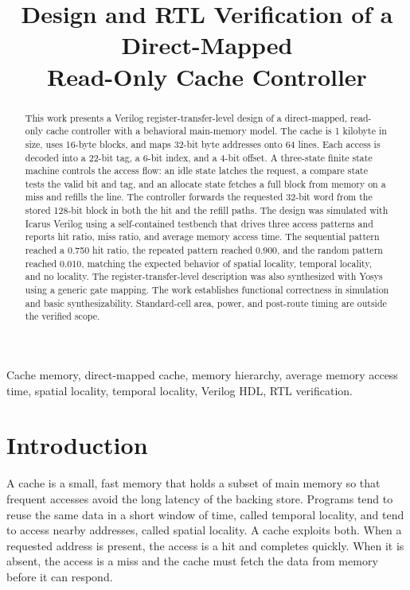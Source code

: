 \documentclass[conference]{IEEEtran}
\begin{document}
\title{Design and RTL Verification of a Direct-Mapped\\ Read-Only Cache Controller}

\author{
}

\maketitle

\begin{abstract}
This work presents a Verilog register-transfer-level design of a direct-mapped, read-only cache controller with a behavioral main-memory model. The cache is 1 kilobyte in size, uses 16-byte blocks, and maps 32-bit byte addresses onto 64 lines. Each access is decoded into a 22-bit tag, a 6-bit index, and a 4-bit offset. A three-state finite state machine controls the access flow: an idle state latches the request, a compare state tests the valid bit and tag, and an allocate state fetches a full block from memory on a miss and refills the line. The controller forwards the requested 32-bit word from the stored 128-bit block in both the hit and the refill paths. The design was simulated with Icarus Verilog using a self-contained testbench that drives three access patterns and reports hit ratio, miss ratio, and average memory access time. The sequential pattern reached a 0.750 hit ratio, the repeated pattern reached 0.900, and the random pattern reached 0.010, matching the expected behavior of spatial locality, temporal locality, and no locality. The register-transfer-level description was also synthesized with Yosys using a generic gate mapping. The work establishes functional correctness in simulation and basic synthesizability. Standard-cell area, power, and post-route timing are outside the verified scope.
\end{abstract}

\begin{IEEEkeywords}
Cache memory, direct-mapped cache, memory hierarchy, average memory access time, spatial locality, temporal locality, Verilog HDL, RTL verification.
\end{IEEEkeywords}

\section{Introduction}
A cache is a small, fast memory that holds a subset of main memory so that frequent accesses avoid the long latency of the backing store. Programs tend to reuse the same data in a short window of time, called temporal locality, and tend to access nearby addresses, called spatial locality. A cache exploits both. When a requested address is present, the access is a hit and completes quickly. When it is absent, the access is a miss and the cache must fetch the data from memory before it can respond.
\end{document}
